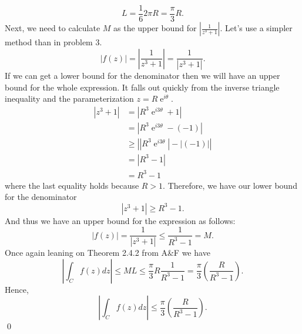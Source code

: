 \documentclass[10pt]{amsart}
\DeclareMathOperator{\E}{e}
\theoremstyle{nonumberplain}
\begin{document}
\begin{enumerate}[label={\bf {\arabic*}:}]
$$
L = \frac 1 6 2\pi R = \frac{\pi}{3} R.
$$
Next, we need to calculate $M$ as the upper bound for $\left| \frac{1}{z^3 + 1} \right|$.
Let's use a simpler method than in problem 3.
$$
\left| f(z) \right| = \left| \frac 1 {z^3 + 1} \right| = \frac 1 {\left|z^3 + 1\right|}.
$$
If we can get a lower bound for the denominator then we will have an upper bound for the whole expression. It falls out quickly from the inverse triangle inequality and the parameterization $z = R\E^{i\theta}$.
\begin{align*}
\left| z^3 + 1\right| &= \left| R^3\E^{i3\theta} + 1\right| \\
	&= \left| R^3\E^{i3\theta} - \left(-1\right)\right| \\
	&\geq \left| \left|R^3\E^{i3\theta}\right| - \left|\left(-1\right)\right|\right| \\
	&= \left| R^3 - 1\right| \\
	&= R^3 - 1
\end{align*}
where the last equality holds because $R > 1$.
Therefore, we have our lower bound for the denominator
$$
\left| z^3 + 1\right| \geq R^3 - 1.
$$
And thus we have an upper bound for the expression as follows:
$$
\left|f(z)\right| = \frac 1 {\left| z^3 + 1\right|} \leq \frac 1 {R^3 - 1} = M.
$$
Once again leaning on Theorem 2.4.2 from A\&F we have
$$
\left| \int_C f(z) dz \right| \leq ML \leq \frac {\pi}{3} R\frac{1}{R^3 - 1} = \frac {\pi}{3} \left(\frac{R}{R^3 - 1}\right).
$$
Hence,
$$
\left| \int_C f(z) dz \right| \leq \frac {\pi}{3} \left(\frac{R}{R^3 - 1}\right).
$$
\qed
\\


\end{enumerate}
\end{document}
